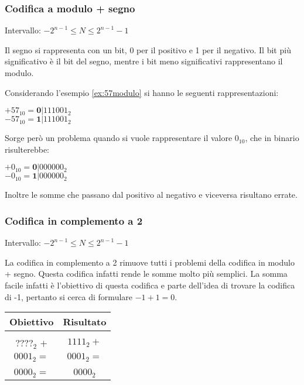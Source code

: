 \documentclass[a4paper]{article}
\theoremstyle{break}
\theoremstyle{break}
\theoremstyle{break}
\theoremstyle{break}
\theoremstyle{break}
\begin{document}
\subsubsection{Codifica a modulo + segno}
\begin{center}
	Intervallo: \( -2^{n-1} \le N \le 2^{n-1}-1 \)
\end{center}
Il segno si rappresenta con un bit, 0 per il positivo e 1 per il negativo.
Il bit più significativo è il bit del segno, mentre i bit meno significativi
rappresentano il modulo.

\begin{center}
\end{center}
Considerando l'esempio \ref{ex:57modulo} si hanno le seguenti rappresentazioni:

\begin{center}
	\( +57_{10}=\textbf{0}|111001_2 \)\\
	\( -57_{10}=\textbf{1}|111001_2 \)
\end{center}
Sorge però un problema quando si vuole rappresentare il valore \( 0_{10} \),
che in binario risulterebbe:

\begin{center}
	\( +0_{10}=\textbf{0}|000000_2 \)\\
	\( -0_{10}=\textbf{1}|000000_2 \)
\end{center}
Inoltre le somme che passano dal positivo al negativo e viceversa risultano errate.

\subsubsection{Codifica in complemento a 2}
\begin{center}
	Intervallo: \( -2^{n-1} \le N \le 2^{n-1}-1 \)
\end{center}
La codifica in complemento a 2 rimuove tutti i problemi della codifica in modulo
+ segno. Questa codifica infatti rende le somme molto più semplici. La somma facile
infatti è l'obiettivo di questa codifica e parte dell'idea di trovare la
codifica di -1, pertanto si cerca di formulare \( -1+1=0 \).

\begin{center}
	\begin{tabular}{ c|c }
		Obiettivo            & Risultato      \\
		\hline                                \\
		\( ????_2 \) \( + \) & \( 1111_2 + \) \\
		\( 0001_2 = \)       & \( 0001_2 = \) \\ [2ex]
		\hline                                \\
		\( 0000_2 = \)       & \( 0000_2 \)   \\
	\end{tabular}
\end{center}
\end{document}

